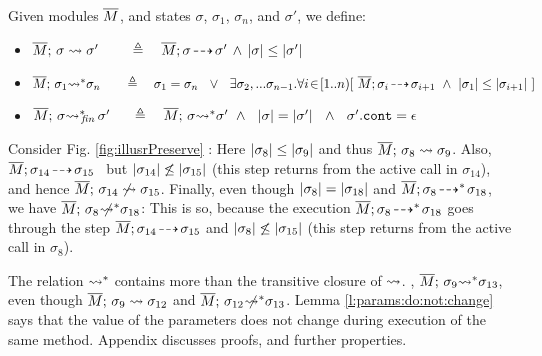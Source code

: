  
 \renewcommand{\EarlierS}[2]{\DepthSt{#1} \leq \DepthSt{#2}}
 \renewcommand{\NotEarlierS}[2]{\DepthSt{#1} \not\leq \DepthSt{#2}} 
 
\begin{definition} Given modules $\overline{M}$, and states $\sigma$, $\sigma_1$, $\sigma_n$, and $\sigma'$, we define:
\label{def:shallow:term}
 
\begin{itemize}

  \item
{  $\leadstoBounded  {\Mtwo} {\sigma}   {\sigma'} \ \ \   \,   \ \ \ \triangleq \ \ \  \leadstoOrig {\Mtwo} {\sigma} {\sigma'} \, \wedge\, 
 \EarlierS {\sigma}  {\sigma'} $}
  \item
{  $\leadstoBoundedStar {\Mtwo}  {\sigma_1}  {\sigma_n}  \ \ \,  \ \    \ \triangleq  \ \ \  {\sigma_1} = {\sigma_n}\ \ \vee \ \  \exists \sigma_2,...\sigma_{n-1}.\forall i\!\in\! [1..n)[\  \leadstoOrig {\Mtwo}  {\sigma_i}  {\sigma_{i+1}}\  \wedge\  \EarlierS{\sigma_1} {\sigma_{i+1}} \ ]$ }
\item
  $\leadstoBoundedStarFin {\Mtwo}  {\sigma}  {\sigma'}  \  \,  \ \  \ \triangleq  \ \ \  \leadstoBoundedStar {\Mtwo}  {\sigma}  {\sigma'}  \ \wedge\ \
 {\DepthFs \sigma = \DepthFs {\sigma'} \ \ \wedge \ \ \sigma'.\prg{cont}=\epsilon  } $
 \end{itemize}
\end{definition}


Consider    Fig. \ref{fig:illusrPreserve} :
Here $\EarlierS {\sigma_8} {\sigma_9}$
and thus $\overline{M};\, {\sigma_8} \rightsquigarrow \sigma_9$.
Also,  $\overline{M};\sigma_{14}\! \dashrightarrow\! {\sigma_{15}}$  \
  but  $\NotEarlierS {\sigma_{14}} {\sigma_{15}} $
  (this step returns from the active call in $\sigma_{14}$),
  and hence   $\overline{M};\, {\sigma_{14}} \not\rightsquigarrow \sigma_{15}$. 
Finally, even though $|\sigma_8| = |\sigma_{18}|$
 and $\overline{M};\sigma_8\! \dashrightarrow^*\! {\sigma_{18}}$, we have  
 $\overline{M};\, {\sigma_8} \not\!\!\!{\rightsquigarrow^*} \sigma_{18}$:
This is so, because the execution $\overline{M};\sigma_8\! \dashrightarrow^*\! {\sigma_{18}}$ goes through the step
$\overline{M};\sigma_{14}\! \dashrightarrow\! {\sigma_{15}}$ and  $\NotEarlierS {\sigma_{8}} {\sigma_{15}} $
 (this step returns from the active call in  $\sigma_8$).

\vspace{.1cm}
{The relation ${\rightsquigarrow^*}$ contains more than the transitive closure of  $\rightsquigarrow$.
\Eg, ${\overline{M};\, {\sigma_9} {\rightsquigarrow^*} \sigma_{13}}$, even though ${\overline{M};\, {\sigma_{9}} \rightsquigarrow \sigma_{12}}$  and ${\overline{M};\, {\sigma_{12}} \not\!\!\!{\rightsquigarrow^*} \sigma_{13}}$.} 
%
Lemma \ref{l:params:do:not:change} says that the value of the parameters does not change during  execution of the same method. 
Appendix  discusses proofs, and further properties.%
 

